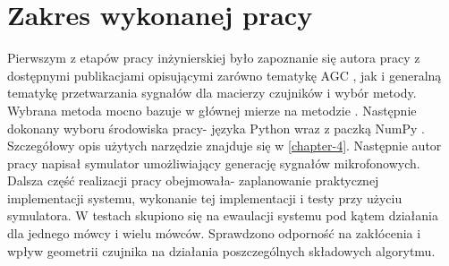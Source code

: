 \section{Zakres wykonanej pracy}
Pierwszym z etapów pracy inżynierskiej było zapoznanie się autora pracy z dostępnymi publikacjami opisującymi zarówno tematykę AGC \cite{Braun2014}, \cite{Archibald2008} jak i generalną tematykę przetwarzania sygnałów dla macierzy czujników \cite{Benesty2008} i wybór metody. Wybrana metoda mocno bazuje w głównej mierze na metodzie \cite{Braun2014}.
Następnie dokonany wyboru środowiska pracy- języka Python wraz z paczką NumPy \cite{numpy}. Szczegółowy opis użytych narzędzie znajduje się w \ref{chapter-4}. Następnie autor pracy napisał symulator umożliwiający generację sygnałów mikrofonowych. Dalsza część realizacji pracy obejmowała- zaplanowanie praktycznej implementacji systemu, wykonanie tej implementacji i testy przy użyciu symulatora. W testach skupiono się na ewaulacji systemu pod kątem działania dla jednego mówcy i wielu mówców. Sprawdzono odporność na zakłócenia i wpływ geometrii czujnika na działania poszczególnych składowych algorytmu.

